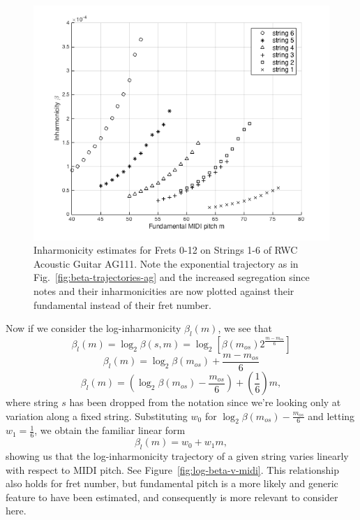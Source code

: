 \documentclass[12pt]{cmuthesis}
\begin{document}
\begin{figure}[h] 
\centering
\includegraphics[scale=0.7]{beta-v-midi}
\caption{Inharmonicity estimates for Frets 0-12 on Strings 1-6 of RWC Acoustic Guitar AG111. Note the exponential trajectory as in Fig.~\ref{fig:beta-trajectories-ag} and the increased segregation since notes and their inharmonicities are now plotted against their fundamental instead of their fret number.}
\label{fig:beta-v-midi}
\end{figure}

Now if we consider the log-inharmonicity $\beta_{l}(m)$, we see that
\begin{equation}
\beta_l(m) = \log_2\beta(s,m) = \log_2[\beta(m_{os})2^{\frac{m-m_{os}}{6}}]
\end{equation}
\begin{equation}
\beta_l(m) = \log_2\beta(m_{os}) + \frac{m-m_{os}}{6}
\end{equation}
\begin{equation}
\beta_l(m) = (\log_2\beta(m_{os})-\frac{m_{os}}{6}) + (\frac{1}{6})m,
\end{equation}
where string $s$ has been dropped from the notation since we're looking only at variation along a fixed string. Substituting $w_0$ for $\log_2\beta(m_{os})-\frac{m_{os}}{6}$ and letting $w_1 = \frac{1}{6}$, we obtain the familiar linear form
\begin{equation}
\label{eq:linear-traj}
\beta_l(m) = w_0 + w_1m,
\end{equation}
showing us that the log-inharmonicity trajectory of a given string varies linearly with respect to MIDI pitch. See Figure~\ref{fig:log-beta-v-midi}. This relationship also holds for fret number, but fundamental pitch is a more likely and generic feature to have been estimated, and consequently is more relevant to consider here.
\end{document}
